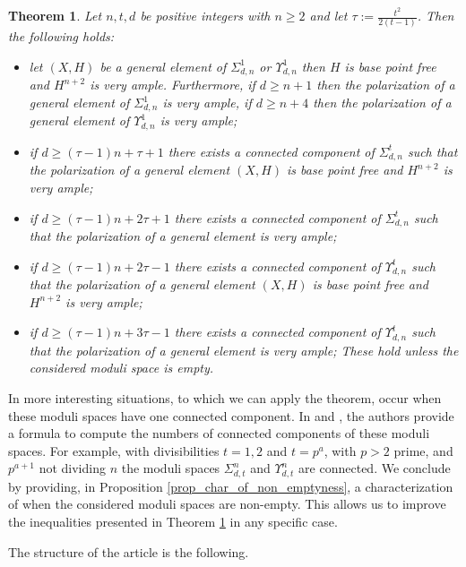 \documentclass{article}
\newtheorem{theorem}[proposition]{Theorem}
\begin{document}
\begin{theorem}\label{theo_main}
    Let $n,t,d$ be positive integers with $n\geq 2$ and let $\tau:=\frac{t^2}{2(t-1)}$. Then the following holds:
    \begin{itemize}
        \item let $(X,H)$ be a general element of $\Sigma_{d,n}^1$ or $\Upsilon_{d,n}^1$ then $H$ is base point free and $H^{n+2}$ is very ample. Furthermore, if $d\geq n+1$ then the polarization of a general element of $\Sigma_{d,n}^1$ is very ample, if $d\ge n+4$ then the polarization of a general element of $\Upsilon_{d,n}^1$ is very ample;
        \item if $d\geq (\tau-1)n+\tau+1$ there exists a connected component of $\Sigma_{d,n}^t$ such that the polarization of a general element $(X,H)$ is base point free and $H^{n+2}$ is very ample;
        \item if $d\geq (\tau-1)n+2\tau+1$ there exists a connected component of $\Sigma_{d,n}^t$ such that the polarization of a general element is very ample;
        \item if $d\geq (\tau-1)n+2\tau-1$ there exists a connected component of $\Upsilon_{d,n}^t$ such that the polarization of a general element $(X,H)$ is base point free and $H^{n+2}$ is very ample;
        \item if $d\geq (\tau-1)n+3\tau-1$ there exists a connected component of $\Upsilon_{d,n}^t$ such that the polarization of a general element is very ample;
        These hold unless the considered moduli space is empty.
    \end{itemize}
\end{theorem}

In more interesting situations, to which we can apply the theorem, occur when these moduli spaces have one connected component. In \cite{onorati2022connectedcomponentsmodulispaces} and \cite{zbMATH06387271}, the authors provide a formula to compute the numbers of connected components of these moduli spaces. For example, with divisibilities $t=1,2$ and $t=p^a$, with $p>2$ prime, and $p^{a+1}$ not dividing $n$ the moduli spaces $\Sigma_{d,t}^n$ and $\Upsilon_{d,t}^n$ are connected. We conclude by providing, in Proposition \ref{prop_char_of_non_emptyness}, a characterization of when the considered moduli spaces are non-empty. This allows us to improve the inequalities presented in Theorem \ref{theo_main} in any specific case. 

The structure of the article is the following.
\end{document}
